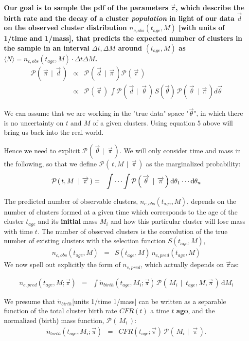 \documentclass[a4paper]{article}
\newcommand{\given}{\ensuremath{\,\mid\,}}
\newcommand{\proba}[2][]{\ensuremath{\mathcal{P}_{#1}\left(\, #2 \,\right)}}
\newcommand{\data}{\ensuremath{\overrightarrow{d}}}
\newcommand{\nclobs}{\ensuremath{n_{c,obs}}}
\newcommand{\nclpred}{\ensuremath{n_{c,pred}}}
\newcommand{\birthrate}{\ensuremath{{\dot n}_{birth}}}
\newcommand{\tage}{\ensuremath{t_{age}}}
\newcommand{\Mi}{\ensuremath{M_{i}}}
\newcommand{\PI}{\ensuremath{\overrightarrow{\pi}}} %
\newcommand{\T}{\ensuremath{\overrightarrow{\theta}}} %
\newcommand{\dif}{\ensuremath{\text{d}}} %
\begin{document}
\medskip


{\bf Our goal is to sample the pdf of the parameters $\PI$, which describe the birth rate and the decay of a cluster {\it population} in light of our data \data on the observed cluster distribution 
$\nclobs(\tage,M)$ [with units of 1/time and 1/mass], that predicts the expected number of clusters in the sample in an interval $\Delta t,\Delta M$ around $(\tage,M)$ as $\langle N\rangle = \nclobs(\tage , M)\cdot \Delta t\Delta M$.}
\,\\
\begin{eqnarray}
\proba{\PI \given \data} &\propto& \proba{\data \given \PI}\proba{\PI}\\
                         &\propto& \proba{\PI}\,\int{\proba{\data \given \T}\,S(\T)\,\proba{\T\given \PI }d\T}
\end{eqnarray}

We can assume that we are working in the "true data" space "$\T$", in which there is no uncertainty on $t$ and $M$ of a given clusters. Using equation 5 above will bring us back into the real world.

Hence we need to explicit \proba{\T\given \PI }. We will only consider time and mass in the following, so that we define \proba{t, M \given \PI} as the marginalized probability:
\begin{eqnarray}
\proba{t, M \given \PI} &=& \idotsint \proba{\T \given \PI} \dif\theta_1 \cdots \dif\theta_n
\end{eqnarray}

The predicted number of observable clusters, $\nclobs(\tage, M)$, depends on the number of clusters formed at a given time which corresponds to the age of the cluster $t_{age}$ and its {\bf initial} mass $\Mi$ and how this particular cluster will lose mass with time $t$.
The number of observed clusters is the convolution of the true number of existing clusters with the selection function $S(\tage, M)$,
\begin{eqnarray}
\nclobs(\tage, M) &=& S(\tage, M)\,\nclpred(\tage, M) 
\end{eqnarray}
We now spell out explicitly the form of \nclpred, which actually depends on \PI as:

\begin{eqnarray}
\nclpred(\tage, M; \PI) &=& \int \birthrate(\tage, \Mi; \PI) \, \proba{\Mi \given \tage, M, \PI}\, \dif\Mi
\end{eqnarray}

We presume that \birthrate [units 1/time 1/mass] can be written as a separable function of the total cluster birth rate $CFR(t)$ a time $t$ {\bf ago}, and the normalized (birth) mass function, $\proba{\Mi}$:
\begin{eqnarray}
\birthrate(\tage, \Mi; \PI) &=& CFR(\tage; \PI) \, \proba{\Mi\given\PI}.
\end{eqnarray}
\end{document}
